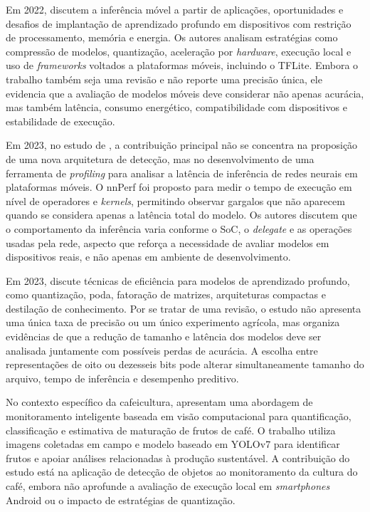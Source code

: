 \documentclass[artigo,times,capa]{iftex2024}
\begin{document}
Em 2022, \textcite{Zhao2022A} discutem a inferência móvel a partir de
aplicações, oportunidades e desafios de implantação de aprendizado profundo em
dispositivos com restrição de processamento, memória e energia. Os autores
analisam estratégias como compressão de modelos, quantização, aceleração por
\textit{hardware}, execução local e uso de \textit{frameworks} voltados a
plataformas móveis, incluindo o \ac{TFLite}. Embora o trabalho também seja uma
revisão e não reporte uma precisão única, ele evidencia que a avaliação de
modelos móveis deve considerar não apenas acurácia, mas também latência,
consumo energético, compatibilidade com dispositivos e estabilidade de execução.

Em 2023, no estudo de \textcite{Chu2023nnPerf}, a contribuição principal não se concentra na proposição de uma
nova arquitetura de detecção, mas no desenvolvimento de uma ferramenta de \textit{profiling} para
analisar a latência de inferência de redes neurais em plataformas móveis. O
nnPerf foi proposto para medir o tempo de execução em nível de
operadores e \textit{kernels}, permitindo observar gargalos que não aparecem
quando se considera apenas a latência total do modelo. Os autores discutem que o
comportamento da inferência varia conforme o \ac{SoC}, o \textit{delegate} e as
operações usadas pela rede, aspecto que reforça a necessidade de avaliar
modelos em dispositivos reais, e não apenas em ambiente de desenvolvimento.

Em 2023, \textcite{Menghani2023Efficient} discute técnicas de eficiência
para modelos de aprendizado profundo, como quantização, poda, fatoração de
matrizes, arquiteturas compactas e destilação de conhecimento. Por se tratar de
uma revisão, o estudo não apresenta uma única taxa de precisão ou um único
experimento agrícola, mas organiza evidências de que a redução de tamanho e
latência dos modelos deve ser analisada juntamente com possíveis perdas de
acurácia. A escolha entre representações de oito ou dezesseis bits pode alterar simultaneamente tamanho do arquivo, tempo de inferência e desempenho preditivo.

No contexto específico da cafeicultura, \textcite{Eron2024Computer} apresentam
uma abordagem de monitoramento inteligente baseada em visão computacional para
quantificação, classificação e estimativa de maturação de frutos de café. O
trabalho utiliza imagens coletadas em campo e modelo baseado em YOLOv7 para
identificar frutos e apoiar análises relacionadas à produção sustentável. A
contribuição do estudo está na aplicação de detecção de objetos ao monitoramento
da cultura do café, embora não aprofunde a avaliação de execução local em
\textit{smartphones} Android ou o impacto de estratégias de quantização.
\end{document}
